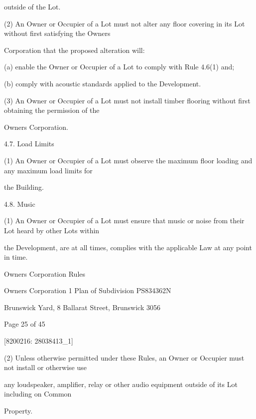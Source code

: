 \documentclass{article}
\begin{document}
{\fontsize{10.02}{1}outside of the Lot. }

{\fontsize{9.962}{1}(2) An Owner or Occupier of a Lot must not alter any floor covering in its Lot without first satisfying the Owners }

{\fontsize{10.02}{1}Corporation that the proposed alteration will: }

{\fontsize{9.962}{1}(a) enable the Owner or Occupier of a Lot to comply with Rule 4.6(1) and; }

{\fontsize{9.962}{1}(b) comply with acoustic standards applied to the Development. }

{\fontsize{9.962}{1}(3) An Owner or Occupier of a Lot must not install timber flooring without first obtaining the permission of the }

{\fontsize{10.02}{1}Owners Corporation. }

{\fontsize{9.99}{1}4.7. Load Limits }

{\fontsize{9.962}{1}(1) An Owner or Occupier of a Lot must observe the maximum floor loading and any maximum load limits for }

{\fontsize{10.02}{1}the Building. }

{\fontsize{9.99}{1}4.8. Music }

{\fontsize{9.962}{1}(1) An Owner or Occupier of a Lot must ensure that music or noise from their Lot heard by other Lots within }

{\fontsize{10.02}{1}the Development, are at all times, complies with the applicable Law at any point in time. }

\newpage





{\fontsize{9}{1}Owners Corporation Rules }

{\fontsize{9}{1}Owners Corporation 1 Plan of Subdivision PS834362N }

{\fontsize{9}{1}Brunswick Yard, 8 Ballarat Street, Brunswick 3056 }


{\fontsize{9}{1}Page 25  of 45 }



{\fontsize{7.02}{1}[8200216: 28038413\_1] }

{\fontsize{9.962}{1}(2) Unless otherwise permitted under these Rules, an Owner or Occupier must not install or otherwise use }

{\fontsize{10.02}{1}any loudspeaker, amplifier, relay or other audio equipment outside of its Lot including on Common }

{\fontsize{10.02}{1}Property. }
\end{document}
